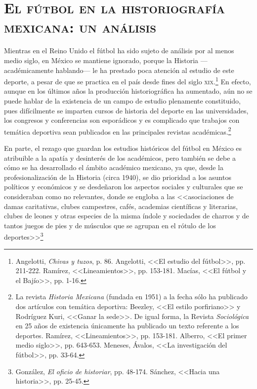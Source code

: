 \documentclass[11pt,a5paper,twoside]{book} %
\begin{document}
\section*{\mdseries\large\textsc{El fútbol en la historiografía mexicana: un análisis}}

\noindent Mientras en el Reino Unido el fútbol ha sido sujeto de análisis por al menos medio siglo, en
México se mantiene ignorado, porque la Historia ---académicamente hablando--- le ha prestado
poca atención al estudio de este deporte, a pesar de que se practica en el país desde fines del
siglo \textsc{xix}.\footnote{Angelotti, \emph{Chivas y tuzos}, p. 86. Angelotti, <<El estudio del fútbol>>, pp. 211-222. Ramírez, <<Lineamientos>>,
pp. 153-181. Macías, <<El fútbol y el Bajío>>, pp. 1-16.} En efecto, aunque en los últimos años la producción historiográfica ha
aumentado, aún no se puede hablar de la existencia de un campo de estudio plenamente
constituido, pues difícilmente se imparten cursos de historia del deporte en las universidades,
los congresos y conferencias son esporádicos y es complicado que trabajos con temática
deportiva sean publicados en las principales revistas académicas.\footnote{La revista \emph{Historia Mexicana} (fundada en 1951) a la fecha sólo ha publicado dos artículos con temática deportiva: Beezley, <<El estilo porfiriano>> y Rodríguez Kuri, <<Ganar la sede>>. De igual forma, la Revista \emph{Sociológica} en 25 años de existencia únicamente ha publicado un texto referente a los deportes. Ramírez, <<Lineamientos>>, pp. 153-181. Alberro, <<El primer medio siglo>>, pp. 643-653. Meneses, Ávalos, <<La investigación del fútbol>>, pp. 33-64.}

En parte, el rezago que guardan los estudios históricos del fútbol en México es
atribuible a la apatía y desinterés de los académicos, pero también se debe a cómo se ha
desarrollado el ámbito académico mexicano, ya que, desde la profesionalización de la
Historia (circa 1940), se dio prioridad a los asuntos políticos y económicos y se desdeñaron los
aspectos sociales y culturales que se consideraban como no relevantes, donde se engloba a las <<asociaciones de damas caritativas, clubes campestres, cafés, academias científicas y literarias, clubes de leones y otras especies de la misma índole y sociedades de charros y de tantos juegos de pies y de músculos que se agrupan en el rótulo de los deportes>>\footnote{González, \emph{El oficio de historiar}, pp. 48-174. Sánchez, <<Hacia una historia>>, pp. 25-45.}
\end{document}

